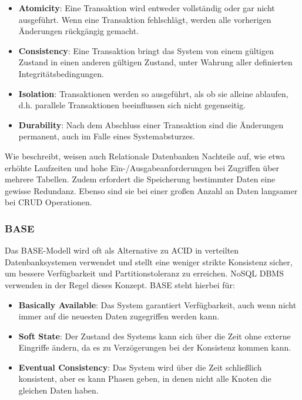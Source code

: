 \begin{itemize}
    \item \textbf{Atomicity}: Eine Transaktion wird entweder vollständig oder gar nicht ausgeführt. Wenn eine Transaktion fehlschlägt, werden alle vorherigen Änderungen rückgängig gemacht.
    \item \textbf{Consistency}: Eine Transaktion bringt das System von einem gültigen Zustand in einen anderen gültigen Zustand, unter Wahrung aller definierten Integritätsbedingungen.
    \item \textbf{Isolation}: Transaktionen werden so ausgeführt, als ob sie alleine ablaufen, d.h. parallele Transaktionen beeinflussen sich nicht gegenseitig.
    \item \textbf{Durability}: Nach dem Abschluss einer Transaktion sind die Änderungen permanent, auch im Falle eines Systemabsturzes.
\end{itemize}
Wie \cite{Paper:performanceComparison} beschreibt, weisen auch Relationale Datenbanken Nachteile auf, wie etwa erhöhte Laufzeiten und hohe Ein-/Ausgabeanforderungen bei Zugriffen über mehrere Tabellen. Zudem erfordert die Speicherung bestimmter Daten eine gewisse \gls{Redundanz}. Ebenso sind sie bei einer großen Anzahl an Daten langsamer bei \gls{CRUD} Operationen. 


\subsubsection{BASE}

\noindent Das BASE-Modell wird oft als Alternative zu ACID in verteilten Datenbanksystemen verwendet und stellt eine weniger strikte Konsistenz sicher, um bessere Verfügbarkeit und Partitionstoleranz zu erreichen. NoSQL DBMS verwenden in der Regel dieses Konzept. BASE steht hierbei für:

\begin{itemize}
    \item \textbf{Basically Available}: Das System garantiert Verfügbarkeit, auch wenn nicht immer auf die neuesten Daten zugegriffen werden kann.
    \item \textbf{Soft State}: Der Zustand des Systems kann sich über die Zeit ohne externe Eingriffe ändern, da es zu Verzögerungen bei der Konsistenz kommen kann.
    \item \textbf{Eventual Consistency}: Das System wird über die Zeit schließlich konsistent, aber es kann Phasen geben, in denen nicht alle Knoten die gleichen Daten haben.
\end{itemize}

